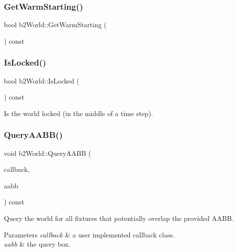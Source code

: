 \subsubsection{\texorpdfstring{GetWarmStarting()}{GetWarmStarting()}}
{\footnotesize\ttfamily bool b2\+World\+::\+Get\+Warm\+Starting (\begin{DoxyParamCaption}{ }\end{DoxyParamCaption}) const\hspace{0.3cm}{\ttfamily [inline]}}

\mbox{\label{classb2_world_a71ca09a3082945a7e77f3f39fb021237}} 
\subsubsection{\texorpdfstring{IsLocked()}{IsLocked()}}
{\footnotesize\ttfamily bool b2\+World\+::\+Is\+Locked (\begin{DoxyParamCaption}{ }\end{DoxyParamCaption}) const\hspace{0.3cm}{\ttfamily [inline]}}



Is the world locked (in the middle of a time step). 

\mbox{\label{classb2_world_ad169fae775be1e1f16386f7587786fa8}} 
\subsubsection{\texorpdfstring{QueryAABB()}{QueryAABB()}}
{\footnotesize\ttfamily void b2\+World\+::\+Query\+A\+A\+BB (\begin{DoxyParamCaption}\item[{\mbox{\hyperlink{classb2_query_callback}{b2\+Query\+Callback}} $\ast$}]{callback,  }\item[{const \mbox{\hyperlink{structb2_a_a_b_b}{b2\+A\+A\+BB}} \&}]{aabb }\end{DoxyParamCaption}) const}

Query the world for all fixtures that potentially overlap the provided A\+A\+BB. 
\begin{DoxyParams}{Parameters}
{\em callback} & a user implemented callback class. \\
\hline
{\em aabb} & the query box. \\
\hline
\end{DoxyParams}
\mbox{\label{classb2_world_aa9955d94a254253997daaf16ce77bab6}} 
